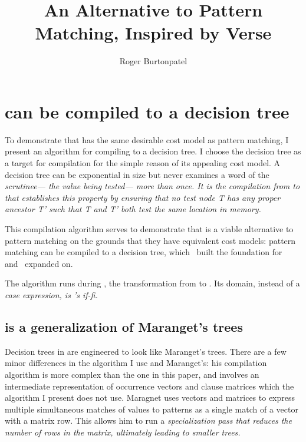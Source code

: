 \documentclass[manuscript,screen,review, 12pt, nonacm]{acmart}
\title{An Alternative to Pattern Matching, Inspired by Verse}
\author{Roger Burtonpatel}
\affiliation{%
\institution{Tufts University}
\streetaddress{419 Boston Ave}
  \city{Medford}
  \state{Massachusetts}
  \country{USA}
  \postcode{02155}
  }
\begin{document}
  

\section{\VMinus can be compiled to a decision tree}
\label{vminustod}
    To demonstrate that \VMinus has the same desirable cost model as pattern
    matching, I present an algorithm for compiling \VMinus to a decision tree. I
    choose the decision tree as a target for compilation for the simple reason
    of its appealing cost model. A decision tree can be exponential in size but
    never examines a word of the \it{scrutinee}--- the value being tested---
    more than once. It is the compilation from \VMinus to \D that establishes
    this property by ensuring that no \it{test} node \it{T} has any proper
    ancestor \it{T'} such that \it{T} and \it{T'} both test the same location in
    memory.   

    This compilation algorithm serves to demonstrate that \VMinus is a viable
    alternative to pattern matching on the grounds that they have equivalent
    cost models: pattern matching can be compiled to a decision tree,
    which~\citet{macqueen1985tree} built the foundation for and~\citet{maranget}
    expanded on. 

    The algorithm runs during \DTran, the transformation from \VMinus to \D. Its
    domain, instead of a \it{case} expression, is \VMinus's \it{if-fi}. 
       
    \subsection{\D is a generalization of Maranget's trees} 


    Decision trees in \D are engineered to look like Maranget's trees. There are
    a few minor differences in the algorithm I use and Maranget's: his
    compilation algorithm is more complex than the one in this paper, and
    involves an intermediate representation of occurrence vectors and clause
    matrices which the algorithm I present does not use. Maragnet uses vectors
    and matrices to express multiple simultaneous matches of values to patterns
    as a single match of a vector with a matrix row. This allows him to run a
    \it{specialization} pass that reduces the number of rows in the matrix,
    ultimately leading to smaller trees. 
        
\end{document}
